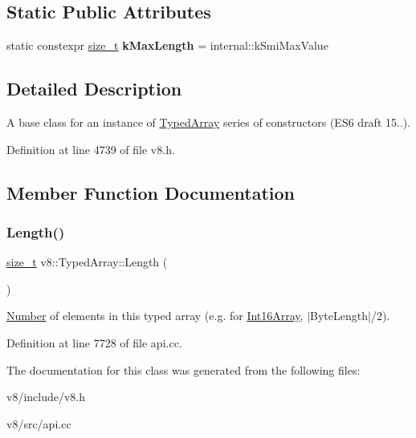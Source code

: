 \subsection*{Static Public Attributes}
\begin{DoxyCompactItemize}
\item 
\mbox{\label{classv8_1_1TypedArray_a54a48f4373da0850663c4393d843b9b0}} 
static constexpr \mbox{\hyperlink{classsize__t}{size\+\_\+t}} {\bfseries k\+Max\+Length} = internal\+::k\+Smi\+Max\+Value
\end{DoxyCompactItemize}


\subsection{Detailed Description}
A base class for an instance of \mbox{\hyperlink{classv8_1_1TypedArray}{Typed\+Array}} series of constructors (E\+S6 draft 15..). 

Definition at line 4739 of file v8.\+h.



\subsection{Member Function Documentation}
\mbox{\label{classv8_1_1TypedArray_abb1047225d53d960c0da9c9f83cd7042}} 
\subsubsection{\texorpdfstring{Length()}{Length()}}
{\footnotesize\ttfamily \mbox{\hyperlink{classsize__t}{size\+\_\+t}} v8\+::\+Typed\+Array\+::\+Length (\begin{DoxyParamCaption}{ }\end{DoxyParamCaption})}

\mbox{\hyperlink{classv8_1_1Number}{Number}} of elements in this typed array (e.\+g. for \mbox{\hyperlink{classv8_1_1Int16Array}{Int16\+Array}}, $\vert$\+Byte\+Length$\vert$/2). 

Definition at line 7728 of file api.\+cc.



The documentation for this class was generated from the following files\+:\begin{DoxyCompactItemize}
\item 
v8/include/v8.\+h\item 
v8/src/api.\+cc\end{DoxyCompactItemize}
